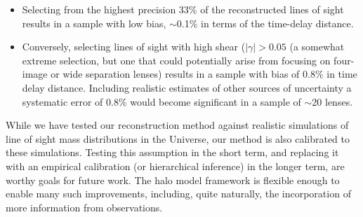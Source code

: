 \documentclass[useAMS,usenatbib,a4paper]{mn2e}
\begin{document}
\begin{itemize}
\item Selecting from the highest precision 33\% of the reconstructed lines of
sight results in a sample with low bias, $\sim$0.1\% in terms of the time-delay
distance. 

\item Conversely, selecting lines of sight with high shear ($|\gamma| > 0.05$
(a somewhat extreme selection, but one that  could potentially arise from 
focusing on four-image or wide separation lenses) results in a sample with
bias of 0.8\% in time delay distance. Including realistic estimates of other
sources of uncertainty a systematic error of 0.8\% would become significant in
a sample of $\sim$20 lenses. 


\end{itemize}





While we have tested our reconstruction method against realistic simulations
of line of sight mass distributions in the Universe, our method is also 
calibrated to these simulations. Testing this assumption in the short term,
and replacing it with an empirical calibration (or hierarchical inference) in
the longer term, are worthy goals for future work. The halo model framework is
flexible enough to enable many such improvements, including, quite naturally,
the incorporation of more information from observations. 
\end{document}
